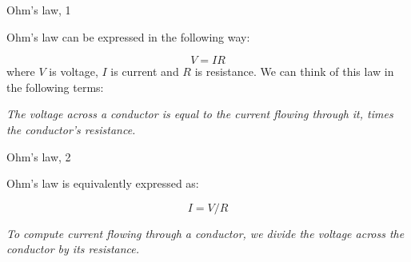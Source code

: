 \documentclass{beamer}
\begin{document}
\begin{frame}{Ohm's law, 1}
\begin{flushleft}

Ohm's law can be expressed in the following way:

\begin{equation}
	V = IR
\end{equation}
%
where $V$ is voltage, $I$ is current and $R$ is resistance. We can think of this law in the following terms:

\bigskip

\emph{The voltage across a conductor is equal to the current flowing through it, times the conductor's resistance.}



\end{flushleft}
\end{frame}





\begin{frame}{Ohm's law, 2}
	\begin{flushleft}
		
		Ohm's law is equivalently expressed as:
		
		\begin{equation}
			I = V / R
		\end{equation}
		
		\bigskip
		
		\emph{To compute current flowing through a conductor, we divide the voltage across the conductor by its resistance.}
		
	\end{flushleft}
\end{frame}
\end{document}
